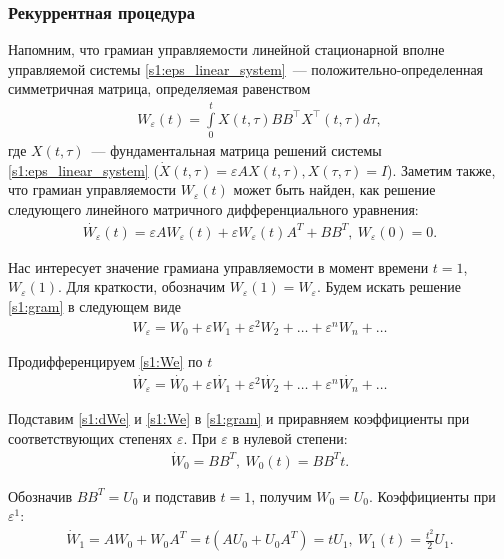 \documentclass[../main.tex]{subfiles}
\begin{document}
\subsubsection{Рекуррентная процедура}
Напомним, что грамиан управляемости линейной стационарной вполне управляемой системы \eqref{s1:eps_linear_system}~--- положительно-определенная симметричная матрица, определяемая равенством
\begin{gather*}
    W_{\varepsilon}(t) = \int \limits_0^t X(t,\tau) B B^{\top} X^{\top}(t,\tau) d\tau,
\end{gather*}
где $ X(t,\tau) $~--- фундаментальная матрица решений системы \eqref{s1:eps_linear_system} ($  \dot{X}(t,\tau) = \varepsilon A X(t,\tau), X(\tau,\tau) = I  $).
Заметим также, что грамиан управляемости $ W_{\varepsilon}(t) $ может быть найден, как решение следующего линейного матричного дифференциального уравнения:
\begin{gather}\label{s1:gram}
    \dot{W_{\varepsilon}}(t) = \varepsilon A W_{\varepsilon}(t) + \varepsilon W_{\varepsilon}(t) A^T + BB^T, \ W_{\varepsilon}(0) = 0.
\end{gather}
 
Нас интересует значение грамиана управляемости в момент времени $ t = 1$, $ W_{\varepsilon}(1) $.
Для краткости, обозначим $ W_{\varepsilon}(1) = W_{\varepsilon} $.
Будем искать решение \eqref{s1:gram} в следующем виде
\begin{gather}\label{s1:We}
    W_{\varepsilon} = W_0 + \varepsilon W_1 + \varepsilon^2 W_2 + \dots + \varepsilon^n W_n + \dots 
\end{gather}
 
Продифференцируем \eqref{s1:We} по $ t $
\begin{gather}\label{s1:dWe}
    \dot{W_{\varepsilon}} = \dot{W_0} + \varepsilon \dot{W_1} + \varepsilon^2 \dot{W_2} + \dots + \varepsilon^n \dot{W_n} + \dots 
\end{gather}
 
Подставим \eqref{s1:dWe} и \eqref{s1:We} в \eqref{s1:gram} и приравняем коэффициенты при соответствующих степенях $ \varepsilon $.
При $ \varepsilon $ в нулевой степени:
\begin{gather*}
    \dot{W}_0 = B B ^T,  \ W_0(t) = B B ^Tt.
\end{gather*}
 
Обозначив $ B B^T = U_0 $ и подставив $ t = 1$, получим $ W_0 = U_0$.
Коэффициенты при $ \varepsilon ^ 1$:
\begin{gather*}
    \dot{W}_1 = A W_0 + W_0 A^T = t \left( A U_0 + U_0 A^T \right) = t U_1 ,  \ W_1(t) = \frac{t^2}{2}U_1.
\end{gather*}
 
\end{document}
